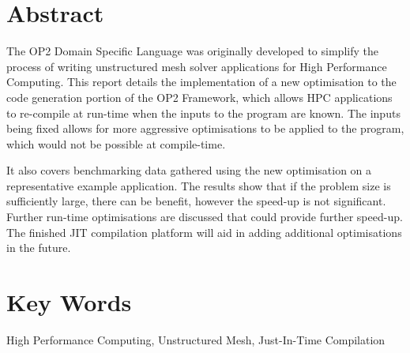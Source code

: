 
%
\vspace*{\fill}
\begin{adjustwidth}{55pt}{55pt}

\section*{Abstract}
The OP2 Domain Specific Language was originally developed to simplify the process of writing unstructured mesh solver applications for High Performance Computing. This report details the implementation of a new optimisation to the code generation portion of the OP2 Framework, which allows HPC applications to re-compile at run-time when the inputs to the program are known. The inputs being fixed allows for more aggressive optimisations to be applied to the program, which would not be possible at compile-time.
\par It also covers benchmarking data gathered using the new optimisation on a representative example application. The results show that if the problem size is sufficiently large, there can be benefit, however the speed-up is not significant. Further run-time optimisations are discussed that could provide further speed-up. The finished JIT compilation platform will aid in adding additional optimisations in the future.

\section*{Key Words}
High Performance Computing, Unstructured Mesh, Just-In-Time Compilation
\end{adjustwidth}
\vspace*{\fill}
